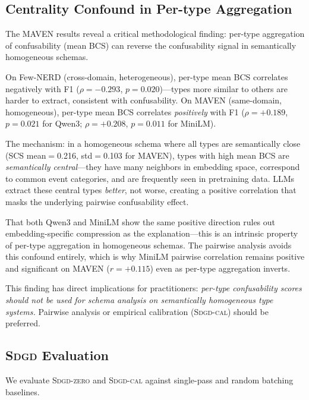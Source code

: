 \documentclass[11pt,a4paper]{article}
\newcommand{\sdgd}{\textsc{Sdgd}}
\newcommand{\sdgdzero}{\textsc{Sdgd-zero}}
\newcommand{\sdgdcal}{\textsc{Sdgd-cal}}
\begin{document}
\subsection{Centrality Confound in Per-type Aggregation}
\label{sec:centrality}

The MAVEN results reveal a critical methodological finding: per-type aggregation of confusability (mean BCS) can reverse the confusability signal in semantically homogeneous schemas.

On Few-NERD (cross-domain, heterogeneous), per-type mean BCS correlates negatively with F1 ($\rho{=}-0.293$, $p{=}0.020$)---types more similar to others are harder to extract, consistent with confusability.
On MAVEN (same-domain, homogeneous), per-type mean BCS correlates \emph{positively} with F1 ($\rho{=}+0.189$, $p{=}0.021$ for Qwen3; $\rho{=}+0.208$, $p{=}0.011$ for MiniLM).

The mechanism: in a homogeneous schema where all types are semantically close (SCS mean$=$0.216, std$=$0.103 for MAVEN), types with high mean BCS are \emph{semantically central}---they have many neighbors in embedding space, correspond to common event categories, and are frequently seen in pretraining data.
LLMs extract these central types \emph{better}, not worse, creating a positive correlation that masks the underlying pairwise confusability effect.

That both Qwen3 and MiniLM show the same positive direction rules out embedding-specific compression as the explanation---this is an intrinsic property of per-type aggregation in homogeneous schemas.
The pairwise analysis avoids this confound entirely, which is why MiniLM pairwise correlation remains positive and significant on MAVEN ($r{=}+0.115$) even as per-type aggregation inverts.

This finding has direct implications for practitioners: \emph{per-type confusability scores should not be used for schema analysis on semantically homogeneous type systems.}
Pairwise analysis or empirical calibration (\sdgdcal{}) should be preferred.


\subsection{\sdgd{} Evaluation}
\label{sec:sdgd-eval}

We evaluate \sdgdzero{} and \sdgdcal{} against single-pass and random batching baselines.
\end{document}
